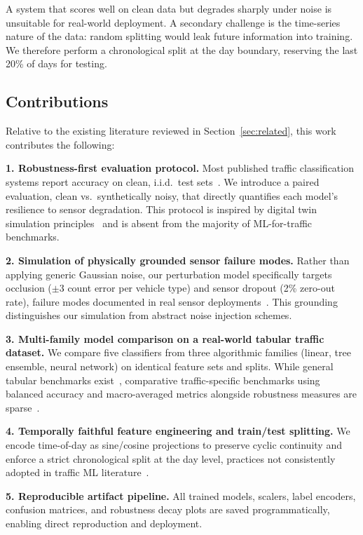 \documentclass[conference,onecolumn,12pt]{IEEEtran}
\begin{document}
A system that scores well on clean data but degrades sharply under noise is
unsuitable for real-world deployment. A secondary challenge is the time-series
nature of the data: random splitting would leak future information into
training. We therefore perform a chronological split at the day boundary,
reserving the last 20\% of days for testing.

\subsection{Contributions}
\label{sec:contributions}

Relative to the existing literature reviewed in Section~\ref{sec:related},
this work contributes the following:

\textbf{1. Robustness-first evaluation protocol.}
Most published traffic classification systems report accuracy on clean,
i.i.d.\ test sets~\cite{kashyap2023,mahmoud2024,sharma2024}. We introduce a
paired evaluation, clean vs.\ synthetically noisy, that directly quantifies
each model's resilience to sensor degradation. This protocol is inspired by
digital twin simulation principles~\cite{abdallah2026,kaewunruen2022} and is
absent from the majority of ML-for-traffic benchmarks.

\textbf{2. Simulation of physically grounded sensor failure modes.}
Rather than applying generic Gaussian noise, our perturbation model
specifically targets occlusion ($\pm$3 count error per vehicle type) and
sensor dropout (2\% zero-out rate), failure modes documented in real sensor
deployments~\cite{xie2024,liu2024}. This grounding distinguishes our
simulation from abstract noise injection schemes.

\textbf{3. Multi-family model comparison on a real-world tabular traffic
dataset.}
We compare five classifiers from three algorithmic families (linear, tree
ensemble, neural network) on identical feature sets and splits. While general
tabular benchmarks exist~\cite{mcelfresh2023}, comparative traffic-specific
benchmarks using balanced accuracy and macro-averaged metrics alongside
robustness measures are sparse~\cite{ting2021,sharma2024}.

\textbf{4. Temporally faithful feature engineering and train/test splitting.}
We encode time-of-day as sine/cosine projections to preserve cyclic continuity
and enforce a strict chronological split at the day level, practices not
consistently adopted in traffic ML literature~\cite{kashyap2023,chen2025}.

\textbf{5. Reproducible artifact pipeline.}
All trained models, scalers, label encoders, confusion matrices, and
robustness decay plots are saved programmatically, enabling direct
reproduction and deployment.
\end{document}
